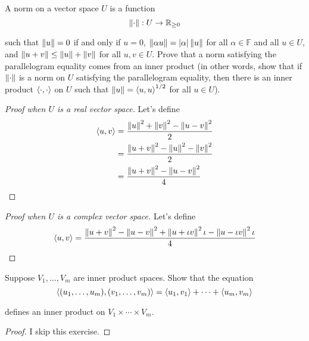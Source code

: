 \begin{exercise}
    A norm on a vector space $U$ is a function
    \[
        \left\Vert{\cdot}\right\Vert: U\to \mathbb{R}_{\geq 0}
    \]

    such that $\left\Vert{u}\right\Vert = 0$ if and only if $u = 0$, $\left\Vert{\alpha u}\right\Vert = \left\vert{\alpha}\right\vert\left\Vert{u}\right\Vert$ for all $\alpha\in\mathbb{F}$ and all $u\in U$, and $\left\Vert{u + v}\right\Vert\leq \left\Vert{u}\right\Vert + \left\Vert{v}\right\Vert$ for all $u, v\in U$. Prove that a norm satisfying the parallelogram equality comes from an inner product (in other words, show that if $\left\Vert{\cdot}\right\Vert$ is a norm on $U$ satisfying the parallelogram equality, then there is an inner product $\left\langle{\cdot, \cdot}\right\rangle$ on $U$ such that $\left\Vert{u}\right\Vert = {\left\langle{u, u}\right\rangle}^{1/2}$ for all $u \in U$).
\end{exercise}

\begin{proof}[Proof when $U$ is a real vector space]
    Let's define
    \begin{align*}
        \left\langle{u, v}\right\rangle & = \frac{\left\Vert{u}\right\Vert^{2} + \left\Vert{v}\right\Vert^{2} - \left\Vert{u - v}\right\Vert^{2}}{2} \\
                         & = \frac{\left\Vert{u + v}\right\Vert^{2} - \left\Vert{u}\right\Vert^{2} - \left\Vert{v}\right\Vert^{2}}{2} \\
                         & = \frac{\left\Vert{u + v}\right\Vert^{2} - \left\Vert{u - v}\right\Vert^{2}}{4}
    \end{align*}
\end{proof}

\begin{proof}[Proof when $U$ is a complex vector space]
    Let's define
    \[
        \left\langle{u, v}\right\rangle = \frac{\left\Vert{u + v}\right\Vert^{2} - \left\Vert{u - v}\right\Vert^{2} + \left\Vert{u + \iota v}\right\Vert^{2}\iota - \left\Vert{u - \iota v}\right\Vert^{2}\iota}{4}
    \]
\end{proof}
\newpage

\begin{exercise}
    Suppose $V_{1}, \ldots, V_{m}$ are inner product spaces. Show that the equation
    \[
        \left\langle{(u_{1}, \ldots, u_{m}), (v_{1}, \ldots, v_{m})}\right\rangle = \left\langle{u_{1}, v_{1}}\right\rangle + \cdots + \left\langle{u_{m}, v_{m}}\right\rangle
    \]

    defines an inner product on $V_{1}\times \cdots \times V_{m}$.
\end{exercise}

\begin{proof}
    I skip this exercise.
\end{proof}
\newpage

